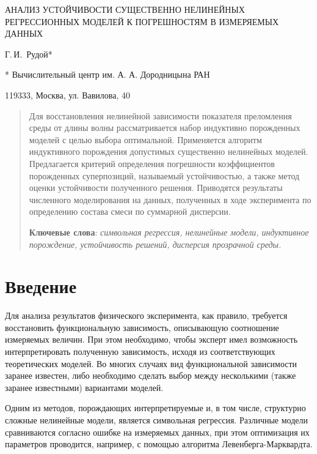 \documentclass[11pt,a4paper]{article}
\theoremstyle{definition}
\begin{document}
\begin{center}
  АНАЛИЗ УСТОЙЧИВОСТИ СУЩЕСТВЕННО НЕЛИНЕЙНЫХ РЕГРЕССИОННЫХ МОДЕЛЕЙ К ПОГРЕШНОСТЯМ В ИЗМЕРЯЕМЫХ
  ДАННЫХ

  Г.\,И.~Рудой*

  \footnotesize
  * Вычислительный центр им. А. А. Дородницына РАН

  119333, Москва, ул. Вавилова, 40
\end{center}

\begin{abstract}
  Для восстановления нелинейной зависимости показателя преломления среды от длины
  волны рассматривается набор индуктивно порожденных моделей с целью выбора оптимальной.
  Применяется алгоритм индуктивного порождения допустимых существенно
  нелинейных моделей. Предлагается критерий определения погрешности коэффициентов порожденных
  суперпозиций, называемый устойчивостью, а также метод оценки устойчивости полученного решения.
  Приводятся результаты численного моделирования на данных, полученных в ходе
  эксперимента по определению состава смеси по суммарной дисперсии.

  \textbf{Ключевые слова}: \emph{символьная регрессия, нелинейные модели, индуктивное порождение,
	устойчивость решений, дисперсия прозрачной среды.}
\end{abstract}

\section*{Введение}

Для анализа результатов физического эксперимента, как правило, требуется
восстановить функциональную зависимость, описывающую соотношение измеряемых
величин. При этом необходимо, чтобы эксперт имел возможность интерпретировать
полученную зависимость, исходя из соответствующих теоретических моделей. Во
многих случаях вид функциональной зависимости заранее известен, либо необходимо
сделать выбор между несколькими (также заранее известными) вариантами моделей.

Одним из методов, порождающих интерпретируемые и, в том числе, структурно
сложные нелинейные модели, является
символьная регрессия\cite{davidson:2000:snrea,reference/ml/X10vc,StrijovW10,Strijov08InductMethods,Rudoy13}. Различные
модели сравниваются согласно ошибке на измеряемых данных, при этом оптимизация
их параметров проводится, например, с помощью алгоритма Левенберга-Марквардта\cite{Marquardt1963Algorithm,more:78}.
\end{document}
